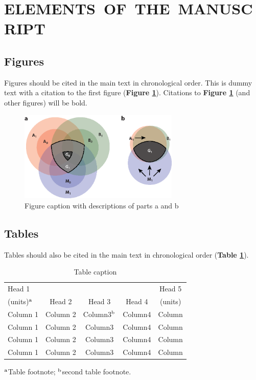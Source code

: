 \documentclass{ar-1col}
\begin{document}
\section{ELEMENTS\ OF\ THE\ MANUSCRIPT} 
\subsection{Figures}Figures should be cited in the main text in chronological order. This is dummy text with a citation to the first figure (\textbf{Figure \ref{fig1}}). Citations to \textbf{Figure \ref{fig1}} (and other figures) will be bold. 

\begin{figure}[h]
\includegraphics[width=3in]{SampleFigure}
\caption{Figure caption with descriptions of parts a and b}
\label{fig1}
\end{figure}

\subsection{Tables} Tables should also be cited in the main text in chronological order (\textbf {Table \ref{tab1}}).

\begin{table}[h]
\caption{Table caption}
\label{tab1}
\begin{center}
\begin{tabular}{@{}l|c|c|c|c@{}}
\hline
Head 1 &&&&Head 5\\
{(}units)$^{\rm a}$ &Head 2 &Head 3 &Head 4 &{(}units)\\
\hline
Column 1 &Column 2 &Column3$^{\rm b}$ &Column4 &Column\\
Column 1 &Column 2 &Column3 &Column4 &Column\\
Column 1 &Column 2 &Column3 &Column4 &Column\\
Column 1 &Column 2 &Column3 &Column4 &Column\\
\hline
\end{tabular}
\end{center}
\begin{tabnote}
$^{\rm a}$Table footnote; $^{\rm b}$second table footnote.
\end{tabnote}
\end{table}
\end{document}
